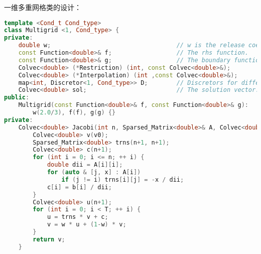 \documentclass{ctexart}
\begin{document}
一维多重网格类的设计：
\begin{lstlisting}[language=c++]
template <Cond_t Cond_type>
class Multigrid <1, Cond_type> {
private:
	double w;									// w is the release coefficient.
	const Function<double>& f;					// The rhs function.
	const Function<double>& g;					// The boundary function.
	Colvec<double> (*Restriction) (int, const Colvec<double>&);
	Colvec<double> (*Interpolation) (int ,const Colvec<double>&);
	map<int, Discretor<1, Cond_type>> D;		// Discretors for different grids.
	Colvec<double> sol;							// The solution vector.
public:
	Multigrid(const Function<double>& f, const Function<double>& g):
		w(2.0/3), f(f), g(g) {}
private:
	Colvec<double> Jacobi(int n, Sparsed_Matrix<double>& A, Colvec<double>& b, const Colvec<double>& v0, int T) {
		Colvec<double> v(v0);
		Sparsed_Matrix<double> trns(n+1, n+1);
		Colvec<double> c(n+1);
		for (int i = 0; i <= n; ++ i) {
			double dii = A[i][i];
			for (auto & [j, x] : A[i])
				if (j != i) trns[i][j] = -x / dii;
			c[i] = b[i] / dii;
		}
		Colvec<double> u(n+1);
		for (int i = 0; i < T; ++ i) {
			u = trns * v + c;
			v = w * u + (1-w) * v;
		}
		return v;
	}


\end{lstlisting}
\end{document}

